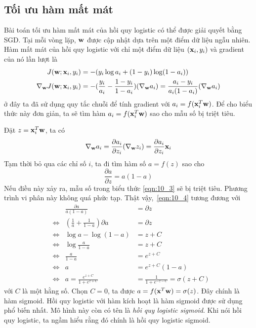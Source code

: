 \subsection{Tối ưu hàm mất mát}
Bài toán tối ưu hàm mất mát của hồi quy logistic có thể được giải quyết bằng
SGD. Tại mỗi vòng lặp, $\mathbf{w}$ được cập nhật dựa trên một điểm dữ liệu ngẫu
nhiên. Hàm mất mát của hồi quy logistic với chỉ một điểm dữ liệu $(\mathbf{x}_i, y_i)$
và gradient của nó lần lượt là
\begin{align}
J(\mathbf{w}; \mathbf{x}_i, y_i) &= -(y_i \log a_i + (1-y_i) \log (1 - a_i)) \\
\label{eqn:10_3}
\nabla_{\mathbf{w}}J(\mathbf{w}; \mathbf{x}_i, y_i)
&= -(\frac{y_i}{a_i} - \frac{1- y_i}{1 - a_i} ) (\nabla_{\mathbf{w}}a_i)
= \frac{a_i - y_i}{a_i(1 - a_i)} (\nabla_{\mathbf{w}}a_i)
\end{align}
ở đây ta đã sử dụng quy tắc chuỗi để tính gradient với $a_i = f(\mathbf{x}_i^T\mathbf{w})$. Để
cho biểu thức này đơn giản, ta sẽ tìm hàm
$a_i = f(\mathbf{x}_i^T\mathbf{w})$ sao cho mẫu số bị triệt tiêu.

Đặt $z = \mathbf{x}_i^T\mathbf{w}$, ta có
\begin{equation}
\label{eqn:10_4a}
\nabla_{\mathbf{w}}a_i
= \frac{\partial a_i}{\partial z_i} (\nabla_{\mathbf{w}}z_i)= \frac{\partial a_i}{\partial
z_i} \mathbf{x}_i
\end{equation}
Tạm thời bỏ qua các chỉ số $i$, ta đi tìm hàm số $a = f(z)$ sao cho
\begin{equation}
\label{eqn:10_4}
\frac{\partial a}{\partial z} = a(1 - a)
\end{equation}
Nếu điều này xảy ra, mẫu số trong biểu thức \eqref{eqn:10_3} sẽ bị triệt tiêu. Phương trình vi phân này không quá phức tạp.
Thật vậy,~\eqref{eqn:10_4} tương đương với
\begin{align*}
&                & \frac{\partial a}{a(1-a)}                 &=  \partial z \\
&\Leftrightarrow & \left(\frac{1}{a} + \frac{1}{1 - a}\right)\partial a &=  \partial z\\
&\Leftrightarrow  &\log a - \log(1 - a)                      &=  z + C \\
&\Leftrightarrow  &\log \frac{a}{1 - a}                      &=  z +C\\
&\Leftrightarrow  &\frac{a}{1 - a}                           &=  e^{z+C} \\
&\Leftrightarrow  &a                                         &=  e^{z+C} (1 - a) \\
&\Leftrightarrow  &a = \frac{e^{z+C}}{1 +e^{z+C}}                    &=  \frac{1}{1 + e^{-z-C}} = \sigma(z+C)
\end{align*}
với $C$ là một hằng số. Chọn $C = 0$, ta được $a = f(\mathbf{x}^T\mathbf{w}) =
\sigma(z)$. Đây chính là hàm sigmoid.
Hồi quy logistic với hàm kích hoạt là hàm sigmoid được sử dụng phổ biến nhất.
Mô hình này còn có tên là \textit{hồi quy logistic sigmoid}. Khi nói hồi quy logistic, ta ngầm hiểu rằng đó chính là hồi quy logistic sigmoid.

